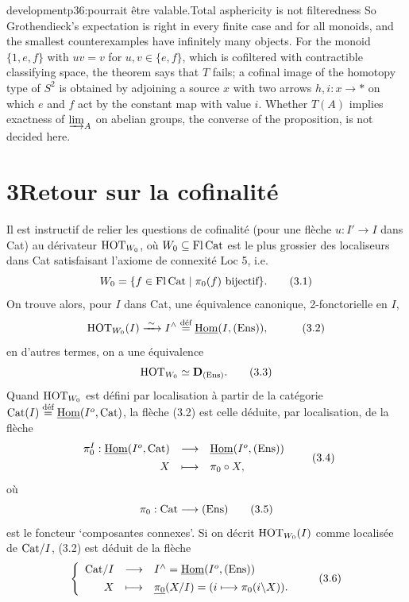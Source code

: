 \begin{dcomment}{development}{p36:pourrait être valable.}{Total asphericity is not filteredness}
So Grothendieck's expectation is right in every finite case and for all monoids, and the smallest counterexamples have infinitely many objects. For the monoid $\{1,e,f\}$ with $uv=v$ for $u,v\in\{e,f\}$, which is cofiltered with contractible classifying space, the theorem says that $T$ fails; a cofinal image of the homotopy type of $S^2$ is obtained by adjoining a source $x$ with two arrows $h,i:x\to*$ on which $e$ and $f$ act by the constant map with value $i$. Whether $T(A)$ implies exactness of $\varinjlim_A$ on abelian groups, the converse of the proposition, is not decided here.
\end{dcomment}



\section*{3\quad Retour sur la cofinalité}

Il est instructif de relier les questions de cofinalité (pour une flèche $u : I' \longrightarrow I$ dans Cat) au dérivateur $\HOT_{W_0}$, où $W_0 \subseteq \Fl\,\Cat$ est le plus grossier des localiseurs dans Cat satisfaisant l'axiome de connexité Loc 5, i.e.
\[
W_0 = \{ f \in \Fl\,\Cat \mid \pi_0(f) \text{ bijectif}\}. \tag*{(3.1)}
\]
On trouve alors, pour $I$ dans Cat, une équivalence canonique, 2-fonctorielle en $I$,
\[
\HOT_{W_0}(I) \xrightarrow{\;\sim\;} I^{\wedge} \defeq \uHom(I,(\Ens)), \quad \tag*{(3.2)}
\]
en d'autres termes, on a une équivalence
\[
\HOT_{W_0} \simeq \mathbf{D}_{(\Ens)}. \tag*{(3.3)}
\]
Quand $\HOT_{W_0}$ est défini par localisation à partir de la catégorie $\Cat(I) \defeq \uHom(I^o,\Cat)$, la flèche (3.2) est celle déduite, par localisation, de la flèche
\[
\begin{array}{rcl}
\pi_0^I : \uHom(I^o,\Cat) & \longrightarrow & \uHom(I^o,(\Ens)) \\[1ex]
X & \longmapsto & \pi_0 \circ X,
\end{array} \tag*{(3.4)}
\]
où
\[
\pi_0 : \Cat \longrightarrow (\Ens) \tag*{(3.5)}
\]
est le foncteur ‘composantes connexes’. Si on décrit $\HOT_{W_0}(I)$ comme localisée de $\Cat/I$, (3.2) est déduit de la flèche
\[
\left\{
\begin{array}{rcl}
\Cat/I & \longrightarrow & I^{\wedge} = \uHom(I^o,(\Ens)) \\[1ex]
X & \longmapsto & \underline{\pi_0}(X/I) = (i \longmapsto \pi_0(i\backslash X)).
\end{array}
\right. \tag*{(3.6)}
\]

